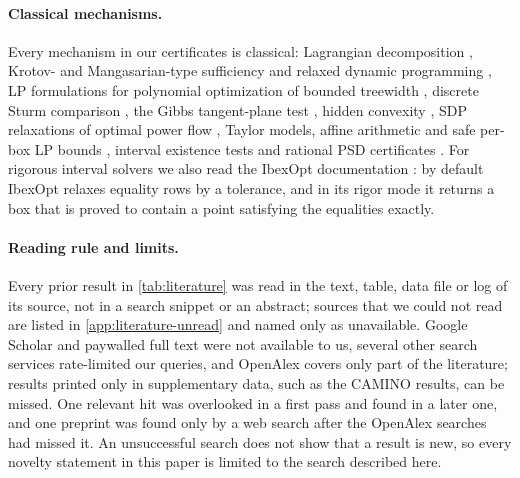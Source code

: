 \paragraph{Classical mechanisms.}
Every mechanism in our certificates is classical: Lagrangian decomposition \citep{geoffrion1972-generalized-benders-decomposition,karuppiah2008-a-lagrangean-based-branch-and,khajavirad2009-a-deterministic-lagrangian-based-global,cao2019-a-scalable-global-optimization-algorithm}, Krotov- and Mangasarian-type sufficiency and relaxed dynamic programming \citep{krotov1967-sufficient-conditions-for-the-optimality,mangasarian1966-sufficient-conditions-for-the-optimal,lincoln2006-relaxing-dynamic-programming}, LP formulations for polynomial optimization of bounded treewidth \citep{bienstock2018-lp-formulations-for-polynomial-optimization}, discrete Sturm comparison \citep{bohner1996-linear-hamiltonian-difference-systems-disconjugacy}, the Gibbs tangent-plane test \citep{mcdonald1995-global-optimization-for-the-phase-2,tessier2000-reliable-phase-stability-analysis-for}, hidden convexity \citep{xia2020-a-survey-of-hidden-convex}, SDP relaxations of optimal power flow \citep{lavaei2012-zero-duality-gap-in-optimal,molzahn2019-a-survey-of-relaxations-and}, Taylor models, affine arithmetic and safe per-box LP bounds \citep{neumaier2003-taylor-formsuse-and-limits,berz2009-rigorous-global-search-using-taylor,figueiredo1997-fast-interval-branch-and-bound,stolfi2003-an-introduction-to-affine-arithmetic,ninin2015-a-reliable-affine-relaxation-method}, interval existence tests \citep{krawczyk1969-newton-algorithmen-zur-bestimmung-von,kearfott1998-on-proving-existence-of-feasible,rump2010-verification-methods-rigorous-results-using} and rational PSD certificates \citep{peyrl2008-computing-sum-of-squares-decompositions}.
For rigorous interval solvers we also read the IbexOpt documentation \citep{ibex2026-ibexopt-ibex-documentation}: by default IbexOpt relaxes equality rows by a tolerance, and in its rigor mode it returns a box that is proved to contain a point satisfying the equalities exactly.

\paragraph{Reading rule and limits.}
Every prior result in \cref{tab:literature} was read in the text, table, data file or log of its source, not in a search snippet or an abstract; sources that we could not read are listed in \cref{app:literature-unread} and named only as unavailable.
Google Scholar and paywalled full text were not available to us, several other search services rate-limited our queries, and OpenAlex covers only part of the literature; results printed only in supplementary data, such as the CAMINO results, can be missed.
One relevant hit \citep{kosolap2019-global-optimization-of-the-general} was overlooked in a first pass and found in a later one, and one preprint \citep{cuesta2025-global-optimization-of-mixed-integer} was found only by a web search after the OpenAlex searches had missed it.
An unsuccessful search does not show that a result is new, so every novelty statement in this paper is limited to the search described here.

